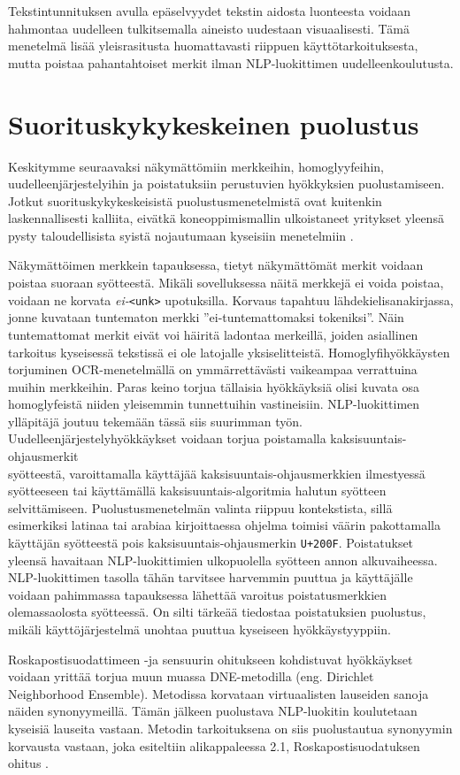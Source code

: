 Tekstintunnituksen avulla epäselvyydet tekstin aidosta luonteesta voidaan hahmontaa uudelleen tulkitsemalla aineisto uudestaan visuaalisesti. Tämä menetelmä lisää yleisrasitusta huomattavasti riippuen käyttötarkoituksesta, mutta poistaa pahantahtoiset merkit ilman NLP-luokittimen uudelleenkoulutusta. \citep{boucher2021bad}

\section{Suorituskykykeskeinen puolustus}
Keskitymme seuraavaksi näkymättömiin merkkeihin, homoglyyfeihin, uudelleenjärjestelyihin ja poistatuksiin perustuvien hyökkyksien puolustamiseen. Jotkut suorituskykykeskeisistä puolustusmenetelmistä ovat kuitenkin laskennallisesti kalliita, eivätkä koneoppimismallin ulkoistaneet yritykset yleensä pysty taloudellisista syistä nojautumaan kyseisiin menetelmiin \citep{https://doi.org/10.48550/arxiv.1911.07399}.

Näkymättöimen merkkein tapauksessa, tietyt näkymättömät merkit voidaan poistaa suoraan syötteestä. Mikäli sovelluksessa näitä merkkejä ei voida poistaa, voidaan ne korvata \textit{ei-}\texttt{<unk>} upotuksilla. Korvaus tapahtuu lähdekielisanakirjassa, jonne kuvataan tuntematon merkki ''ei-tuntemattomaksi tokeniksi''. Näin tuntemattomat merkit eivät voi häiritä ladontaa merkeillä, joiden asiallinen tarkoitus kyseisessä tekstissä ei ole latojalle yksiselitteistä. Homoglyfihyökkäysten torjuminen OCR-menetelmällä on ymmärrettävästi vaikeampaa verrattuina muihin merkkeihin. Paras keino torjua tällaisia hyökkäyksiä olisi kuvata osa homoglyfeistä niiden yleisemmin tunnettuihin vastineisiin. NLP-luokittimen ylläpitäjä joutuu tekemään tässä siis suurimman työn. Uudelleenjärjestelyhyökkäykset voidaan torjua poistamalla kaksisuuntais-ohjausmerkit\\syötteestä, varoittamalla käyttäjää kaksisuuntais-ohjausmerkkien ilmestyessä syötteeseen tai käyttämällä kaksisuuntais-algoritmia halutun syötteen selvittämiseen. Puolustusmenetelmän valinta riippuu kontekstista, sillä esimerkiksi latinaa tai arabiaa kirjoittaessa ohjelma toimisi väärin pakottamalla käyttäjän syötteestä pois kaksisuuntais-ohjausmerkin \texttt{U+200F}. Poistatukset yleensä havaitaan NLP-luokittimien ulkopuolella syötteen annon alkuvaiheessa. NLP-luokittimen tasolla tähän tarvitsee harvemmin puuttua ja käyttäjälle voidaan pahimmassa tapauksessa lähettää varoitus poistatusmerkkien olemassaolosta syötteessä. On silti tärkeää tiedostaa poistatuksien puolustus, mikäli käyttöjärjestelmä unohtaa puuttua kyseiseen hyökkäystyyppiin. \citep{boucher2021bad}

Roskapostisuodattimeen -ja sensuurin ohitukseen kohdistuvat hyökkäykset voidaan yrittää torjua muun muassa DNE-metodilla (eng. Dirichlet Neighborhood Ensemble). Metodissa korvataan virtuaalisten lauseiden sanoja näiden synonyymeillä. Tämän jälkeen puolustava NLP-luokitin koulutetaan kyseisiä lauseita vastaan. Metodin tarkoituksena on siis puolustautua synonyymin korvausta vastaan, joka esiteltiin alikappaleessa 2.1, Roskapostisuodatuksen ohitus \citep{dnedefense}.